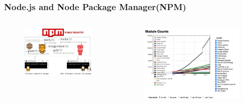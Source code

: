 \documentclass{beamer}
\begin{document}
\begin{frame}
\frametitle{Node.js and Node Package Manager(NPM)}
\begin{columns}
\begin{figure}
    \centering
    \includegraphics[width=\textwidth]{npm.jpeg}
\end{figure}
\begin{figure}
    \centering
    \includegraphics[width=\textwidth]{modulecount.jpg}
\end{figure}
\end{columns}

\end{frame}
\end{document}
